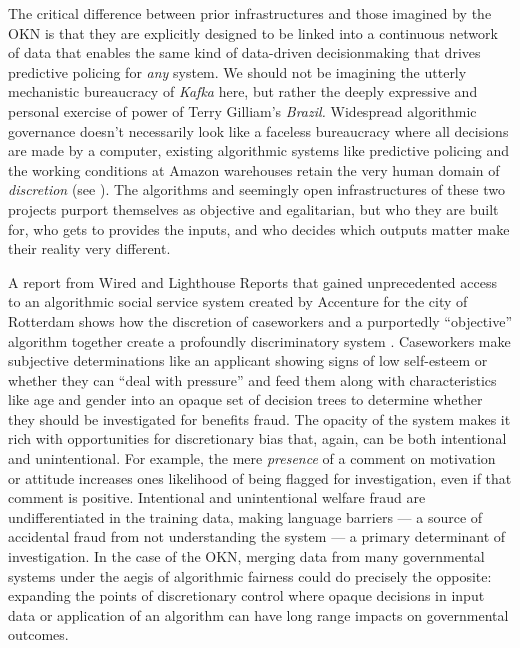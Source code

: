 The critical difference between prior infrastructures and those imagined
by the OKN is that they are explicitly designed to be linked into a
continuous network of data that enables the same kind of data-driven
decisionmaking that drives predictive policing for \emph{any} system. We
should not be imagining the utterly mechanistic bureaucracy of
\emph{Kafka} here, but rather the deeply expressive and personal
exercise of power of Terry Gilliam's \emph{Brazil.} Widespread
algorithmic governance doesn't necessarily look like a faceless
bureaucracy where all decisions are made by a computer, existing
algorithmic systems like predictive policing and the working conditions
at Amazon warehouses retain the very human domain of \emph{discretion}
(see \cite{hongPredictionExtractionDiscretion2022} ). The
algorithms and seemingly open infrastructures of these two projects
purport themselves as objective and egalitarian, but who they are built
for, who gets to provides the inputs, and who decides which outputs
matter make their reality very different.

A report from Wired and Lighthouse Reports that gained unprecedented
access to an algorithmic social service system created by Accenture for
the city of Rotterdam shows how the discretion of caseworkers and a
purportedly ``objective'' algorithm together create a profoundly
discriminatory system \cite{constantarasSuspicionMachine2023, braunSuspicionMachinesMethodology2023} . Caseworkers make subjective
determinations like an applicant showing signs of low self-esteem or
whether they can ``deal with pressure'' and feed them along with
characteristics like age and gender into an opaque set of decision trees
to determine whether they should be investigated for benefits fraud. The
opacity of the system makes it rich with opportunities for discretionary
bias that, again, can be both intentional and unintentional. For
example, the mere \emph{presence} of a comment on motivation or attitude
increases ones likelihood of being flagged for investigation, even if
that comment is positive. Intentional and unintentional welfare fraud
are undifferentiated in the training data, making language barriers ---
a source of accidental fraud from not understanding the system --- a
primary determinant of investigation. In the case of the OKN, merging
data from many governmental systems under the aegis of algorithmic
fairness could do precisely the opposite: expanding the points of
discretionary control where opaque decisions in input data or
application of an algorithm can have long range impacts on governmental
outcomes.

